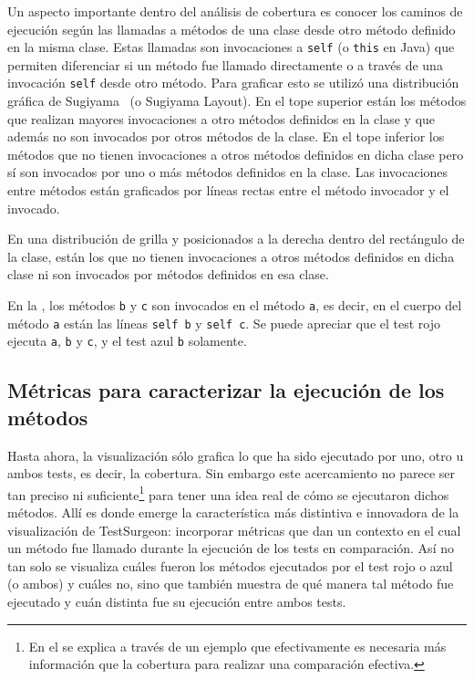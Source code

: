\par Un aspecto importante dentro del análisis de cobertura es conocer los caminos de ejecución según las llamadas a métodos de una clase desde otro método definido en la misma clase. Estas llamadas son invocaciones a {\tt self} (o {\tt this} en Java) que permiten diferenciar si un método fue llamado directamente o a través de una invocación {\tt self} desde otro método. Para graficar esto se utilizó una distribución gráfica de Sugiyama~\cite{sugiyama1981methods} (o Sugiyama Layout). En el tope superior están los métodos que realizan mayores invocaciones a otro métodos definidos en la clase y que además no son invocados por otros métodos de la clase. En el tope inferior los métodos que no tienen invocaciones a otros métodos definidos en dicha clase pero sí son invocados por uno o más métodos definidos en la clase. Las invocaciones entre métodos están graficados por líneas rectas entre el método invocador y el invocado.

\par En una distribución de grilla y posicionados a la derecha dentro del rectángulo de la clase, están los que no tienen invocaciones a otros métodos definidos en dicha clase ni son invocados por métodos definidos en esa clase.


\par En la , los métodos {\tt b} y {\tt c} son invocados en el método {\tt a}, es decir, en el cuerpo del método {\tt a} están las líneas {\tt self b} y {\tt self c}. Se puede apreciar que el test rojo ejecuta {\tt a}, {\tt b} y {\tt c}, y el test azul {\tt b} solamente. 

\subsection{Métricas para caracterizar la ejecución de los métodos }

\par Hasta ahora, la visualización sólo grafica lo que ha sido ejecutado por uno, otro u ambos tests, es decir, la cobertura. Sin embargo este acercamiento no parece ser tan preciso ni suficiente\footnote{En el  se explica a través de un ejemplo que efectivamente es necesaria más información que la cobertura para realizar una comparación efectiva.} para tener una idea real de cómo se ejecutaron dichos métodos. Allí es donde emerge la característica más distintiva e innovadora de la visualización de TestSurgeon: incorporar métricas que dan un contexto en el cual un método fue llamado durante la ejecución de los tests en comparación. Así no tan solo se visualiza cuáles fueron los métodos ejecutados por el test rojo o azul (o ambos) y cuáles no, sino que también muestra de qué manera tal método fue ejecutado y cuán distinta fue su ejecución entre ambos tests.

